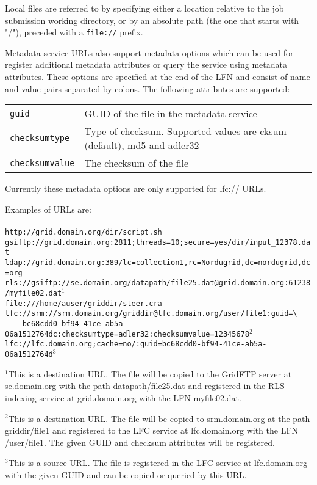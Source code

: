Local files are referred to by specifying either a location relative
to the job submission working directory, or by an absolute path (the
one that starts with "/"), preceded with a \verb#file://# prefix.

Metadata service URLs also support metadata options which can be used
for register additional metadata attributes or query the service using
metadata attributes. These options are specified at the end of the LFN
and consist of name and value pairs separated by colons. The following
attributes are supported:

\begin{tabular}{lp{10cm}}
   \verb#guid# & GUID of the file in the metadata service \\
   \verb#checksumtype# & Type of checksum. Supported values are cksum
   (default), md5 and adler32 \\
   \verb#checksumvalue# & The checksum of the file \\
\end{tabular}

Currently these metadata options are only supported for lfc:// URLs.

\begin{framed}
   Examples of URLs are:\\
   \\
   \verb#http://grid.domain.org/dir/script.sh#\\
   \verb#gsiftp://grid.domain.org:2811;threads=10;secure=yes/dir/input_12378.dat#\\
   \verb#ldap://grid.domain.org:389/lc=collection1,rc=Nordugrid,dc=nordugrid,dc=org#\\
   \verb#rls://gsiftp://se.domain.org/datapath/file25.dat@grid.domain.org:61238/myfile02.dat#$^1$\\
   \verb#file:///home/auser/griddir/steer.cra#\\
   \verb#lfc://srm://srm.domain.org/griddir@lfc.domain.org/user/file1:guid=\# \\
   \verb#    bc68cdd0-bf94-41ce-ab5a-06a1512764dc:checksumtype=adler32:checksumvalue=12345678#$^2$\\
   \verb#lfc://lfc.domain.org;cache=no/:guid=bc68cdd0-bf94-41ce-ab5a-06a1512764d#$^3$\\
\end{framed}

$^1$This is a destination URL. The file will be copied to the GridFTP
server at se.domain.org with the path datapath/file25.dat and
registered in the RLS indexing service at grid.domain.org with the LFN
myfile02.dat.

$^2$This is a destination URL. The file will be copied to
srm.domain.org at the path griddir/file1 and registered to the LFC
service at lfc.domain.org with the LFN /user/file1. The given GUID
and checksum attributes will be registered.

$^3$This is a source URL. The file is registered in the LFC service at
lfc.domain.org with the given GUID and can be copied or queried by
this URL.
